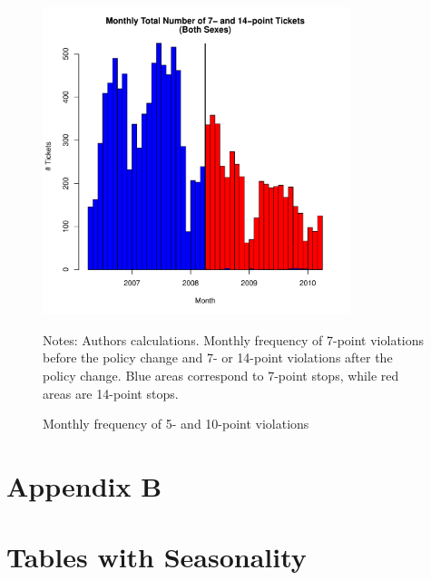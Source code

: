 \begin{figure}
\centering
\includegraphics[width=0.8\textwidth]{../Figures/num_pts_7_14_all_orig.pdf}
\caption{Monthly frequency of 5- and 10-point violations }
Notes: Authors calculations. Monthly frequency of 7-point violations before the policy change and 7- or 14-point violations after the policy change. Blue areas correspond to 7-point stops, while red areas are 14-point stops.
\label{fig:num_pts_7_14_all}
\end{figure}




















\clearpage
\pagebreak

\section*{Appendix B}
\vspace{3.0in}

\section*{Tables with Seasonality}
\label{sec:Appendix}

